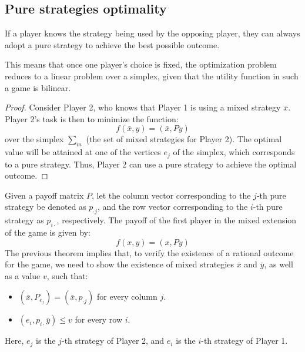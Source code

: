 \subsection{Pure strategies optimality}
\begin{theorem}
    If a player knows the strategy being used by the opposing player, they can always adopt a pure strategy to achieve the best possible outcome.
\end{theorem}
This means that once one player's choice is fixed, the optimization problem reduces to a linear problem over a simplex, given that the utility function in such a game is bilinear.
\begin{proof}
    Consider Player 2, who knows that Player 1 is using a mixed strategy $\bar{x}$. 
    Player 2's task is then to minimize the function:
    \[f (\bar{x}, y) = (\bar{x}, Py)\]
    over the simplex $\sum_m$ (the set of mixed strategies for Player 2). 
    The optimal value will be attained at one of the vertices $e_j$ of the simplex, which corresponds to a pure strategy.
    Thus, Player 2 can use a pure strategy to achieve the optimal outcome.
\end{proof}
Given a payoff matrix  $P$, let the column vector corresponding to the $j$-th pure strategy be denoted as $p_{\cdot j}$, and the row vector corresponding to the $i$-th pure strategy as $p_{i\cdot}$, respectively. 
The payoff of the first player in the mixed extension of the game is given by:
\[f(x,y)=(x,Py)\]
The previous theorem implies that, to verify the existence of a rational outcome for the game, we need to show the existence of mixed strategies $\bar{x}$ and $\bar{y}$, as well as a value $v$, such that: 
\begin{itemize}
    \item $(\bar{x},P_{e_j})=(\bar{x},p_{\cdot j})$ for every column $j$. 
    \item $(e_i,p_{i\cdot}\bar{y})\leq v$ for every row $i$.
\end{itemize}
Here, $e_j$ is the $j$-th strategy of Player 2, and $e_i$ is the $i$-th strategy of Player 1.